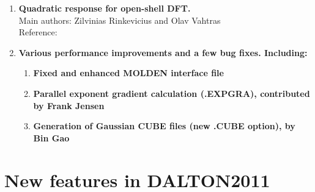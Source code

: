 \begin{enumerate}
\cite{vahtrasjpb97}\\
\cite{agrencpl94}\\
\item{\bf  Quadratic response for open-shell DFT.}\\
Main authors: Zilvinias Rinkevicius and Olav Vahtras\\
Reference:\\
 \cite{rinkeviciusjctc08}
\item{\bf  Various performance improvements and a few bug fixes. Including:}
\begin{enumerate}
   \item{\bf  Fixed and enhanced MOLDEN interface file}
   \item{\bf  Parallel exponent gradient calculation (.EXPGRA), contributed by Frank Jensen}
   \item{\bf  Generation of Gaussian CUBE files (new .CUBE option), by Bin Gao}
\end{enumerate}
\end{enumerate}

\section{New features in DALTON2011}

